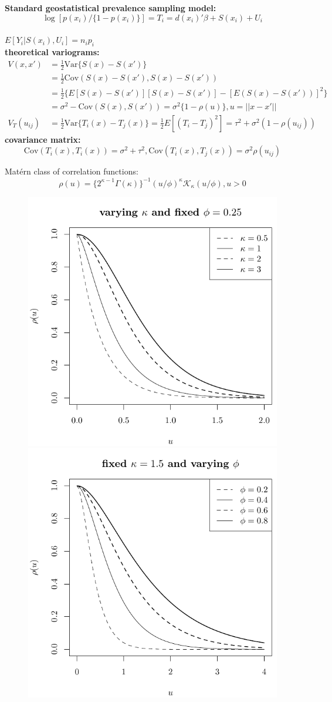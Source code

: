 \documentclass[11pt,compress,UTF8]{beamer}
\begin{document}
\begin{frame}  %
\textbf{Standard geostatistical prevalence sampling model:}\\
$$\log[p(x_i)/\{1-p(x_i)\}]=T_{i}=d(x_i)'\beta+S(x_i)+U_{i} $$ \\
$E[Y_{i}|S(x_i),U_{i}]=n_{i}p_{i}$\\
\textbf{theoretical variograms:}
\begin{equation*}
\begin{aligned}
V(x,x')&=\frac{1}{2}\mathrm{Var}\{S(x)-S(x')\}\\
&=\frac{1}{2}\mathrm{Cov}(S(x)-S(x'),S(x)-S(x'))\\
&=\frac{1}{2}\{E[S(x)-S(x')][S(x)-S(x')]-[E(S(x)-S(x'))]^2\}\\
&=\sigma^2-\mathrm{Cov}(S(x),S(x'))=\sigma^2\{1-\rho(u)\},u=||x-x'|| \\
V_{T}(u_{ij})&=\frac{1}{2}\mathrm{Var}\{T_{i}(x)-T_{j}(x)\}
=\frac{1}{2}E[(T_{i}-T_{j})^2]=\tau^2+\sigma^2(1-\rho(u_{ij}))
\end{aligned}
\end{equation*}
\textbf{covariance matrix:}
$$\mathrm{Cov}(T_{i}(x),T_{i}(x)) = \sigma^2+\tau^2, \mathrm{Cov}(T_{i}(x),T_{j}(x))=\sigma^2\rho(u_{ij})$$
\end{frame}

\begin{frame}
Mat\'ern class of correlation functions: $$\rho(u)=\{2^{\kappa -1}\Gamma(\kappa)\}^{-1}(u/\phi)^{\kappa}\mathcal{K}_{\kappa}(u/\phi),u > 0$$
\begin{figure}
\centering
\includegraphics[width=.45\textwidth]{matern1}
\includegraphics[width=.45\textwidth]{matern2}
\end{figure}
\end{frame}
\end{document}
